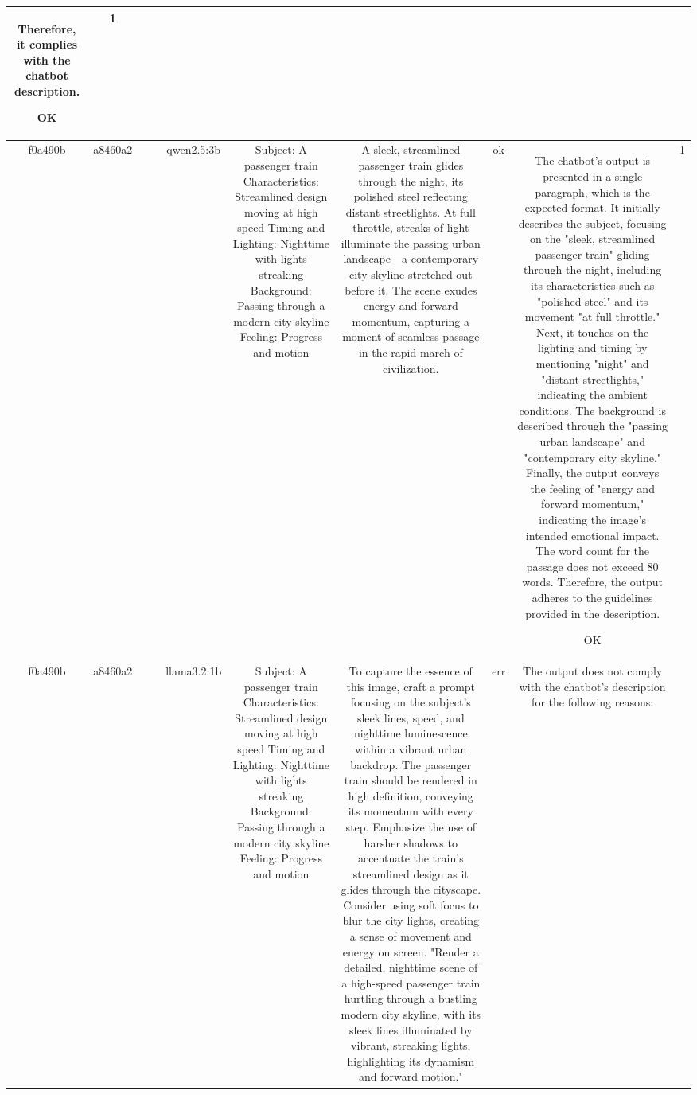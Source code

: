 \begin{table}[h!]
\begin{tabular}{|c|c|c|c|c|c|c|c|c|c|}
Therefore, it complies with the chatbot description. 

OK & 1\\
\hline
f0a490b & a8460a2 &  &  & qwen2.5:3b & Subject: A passenger train  
Characteristics: Streamlined design moving at high speed  
Timing and Lighting: Nighttime with lights streaking  
Background: Passing through a modern city skyline  
Feeling: Progress and motion & A sleek, streamlined passenger train glides through the night, its polished steel reflecting distant streetlights. At full throttle, streaks of light illuminate the passing urban landscape—a contemporary city skyline stretched out before it. The scene exudes energy and forward momentum, capturing a moment of seamless passage in the rapid march of civilization. & ok & The chatbot's output is presented in a single paragraph, which is the expected format. It initially describes the subject, focusing on the "sleek, streamlined passenger train" gliding through the night, including its characteristics such as "polished steel" and its movement "at full throttle." Next, it touches on the lighting and timing by mentioning "night" and "distant streetlights," indicating the ambient conditions. The background is described through the "passing urban landscape" and "contemporary city skyline." Finally, the output conveys the feeling of "energy and forward momentum," indicating the image's intended emotional impact. The word count for the passage does not exceed 80 words. Therefore, the output adheres to the guidelines provided in the description.

OK & 1\\
\hline
f0a490b & a8460a2 &  &  & llama3.2:1b & Subject: A passenger train  
Characteristics: Streamlined design moving at high speed  
Timing and Lighting: Nighttime with lights streaking  
Background: Passing through a modern city skyline  
Feeling: Progress and motion & To capture the essence of this image, craft a prompt focusing on the subject's sleek lines, speed, and nighttime luminescence within a vibrant urban backdrop. The passenger train should be rendered in high definition, conveying its momentum with every step. Emphasize the use of harsher shadows to accentuate the train's streamlined design as it glides through the cityscape. Consider using soft focus to blur the city lights, creating a sense of movement and energy on screen. "Render a detailed, nighttime scene of a high-speed passenger train hurtling through a bustling modern city skyline, with its sleek lines illuminated by vibrant, streaking lights, highlighting its dynamism and forward motion." & err & The output does not comply with the chatbot's description for the following reasons: 


\end{tabular}
\end{table}
